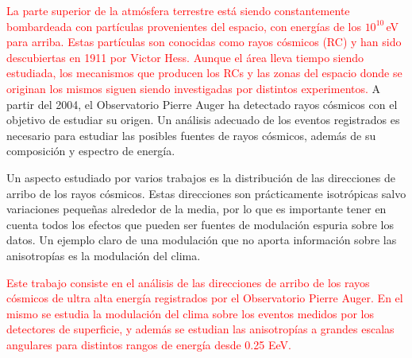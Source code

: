 



\textcolor{red}{La parte superior de la atmósfera terrestre está siendo constantemente bombardeada con partículas provenientes del espacio, con energías de los $10^{10}\,$eV para arriba. Estas partículas son conocidas como rayos cósmicos (RC) y han sido descubiertas en 1911 por Victor Hess. Aunque el área lleva tiempo siendo estudiada, los mecanismos que producen los RCs y las zonas del espacio donde se originan los mismos siguen siendo investigadas por distintos experimentos.}  A partir del 2004, el Observatorio Pierre Auger ha detectado rayos cósmicos con el objetivo de estudiar su origen. Un análisis adecuado de los eventos registrados es necesario para estudiar las posibles fuentes de rayos cósmicos, además de su composición y espectro de energía.

Un aspecto estudiado por varios trabajos \cite{collaboration2013pierre} \cite{data} es la distribución de las direcciones de arribo de los rayos cósmicos. Estas direcciones son prácticamente isotrópicas salvo variaciones pequeñas alrededor de la media, por lo que es importante tener en cuenta todos los efectos que pueden ser fuentes de modulación espuria sobre los datos. Un ejemplo claro de una modulación que no aporta información sobre las anisotropías es la modulación del clima.

\textcolor{red}{Este trabajo consiste en el análisis de las direcciones de arribo de los rayos cósmicos de ultra alta energía registrados por el Observatorio Pierre Auger. En el mismo se estudia la modulación del clima sobre los eventos medidos por los detectores de superficie, y además se estudian las anisotropías a grandes escalas angulares para distintos rangos de energía desde 0.25 EeV.}  %




